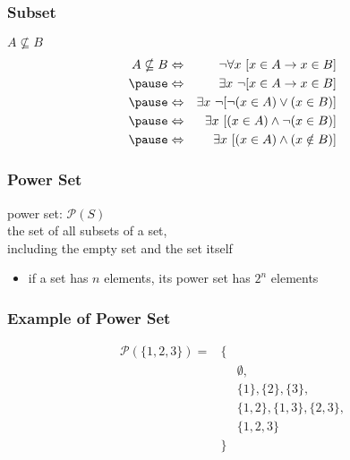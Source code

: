 \documentclass[dvipsnames]{beamer}
\begin{document}
\begin{frame}
  \frametitle{Subset}

  \begin{block}{$A \nsubseteq B$}
    \begin{eqnarray*}
      A \nsubseteq B & \Leftrightarrow
                     & \neg \forall x~[x \in A \rightarrow x \in B]\\\pause
                     & \Leftrightarrow
                     & \exists x~\neg [x \in A \rightarrow x \in B]\\\pause
                     & \Leftrightarrow
                     & \exists x~\neg [\neg (x \in A) \vee (x \in B)]\\\pause
                     & \Leftrightarrow
                     & \exists x~[(x \in A) \wedge \neg (x \in B)]\\\pause
                     & \Leftrightarrow
                     & \exists x~[(x \in A) \wedge (x \notin B)]
    \end{eqnarray*}
  \end{block}
\end{frame}

\begin{frame}
  \frametitle{Power Set}

  \begin{definition}
    \alert{power set}: $\mathcal{P}(S)$\\
    the set of all subsets of a set,\\
    including the empty set and the set itself
  \end{definition}

  \begin{itemize}
    \item if a set has $n$ elements, its power set has $2^n$ elements
  \end{itemize}
\end{frame}

\begin{frame}
  \frametitle{Example of Power Set}

  \begin{example}
    \begin{eqnarray*}
      \mathcal{P}(\{1,2,3\}) = & \{ &\\
                               &    & \emptyset,\\
                               &    & \{1\},\{2\},\{3\},\\
                               &    & \{1,2\},\{1,3\},\{2,3\},\\
                               &    & \{1,2,3\}\\
                               & \} &
    \end{eqnarray*}
  \end{example}
\end{frame}
\end{document}
